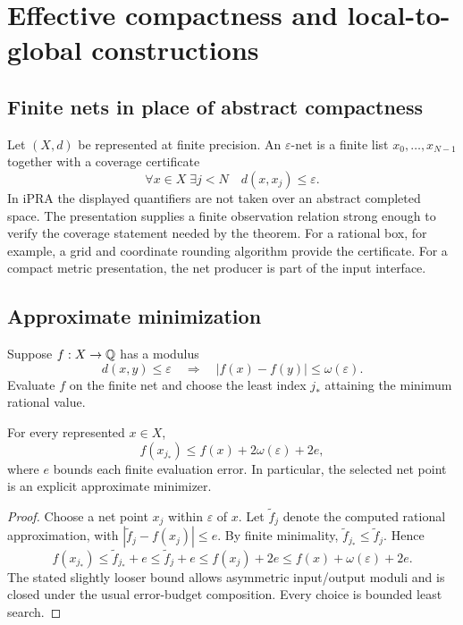 \section{Effective compactness and local-to-global constructions}
\label{sec:compact}

\subsection{Finite nets in place of abstract compactness}

Let \((X,d)\) be represented at finite precision.  An \(\varepsilon\)-net is a
finite list \(x_0,\ldots,x_{N-1}\) together with a coverage certificate
\[
       \forall x\in X\;\exists j<N\quad d(x,x_j)\le\varepsilon.
\]
In iPRA the displayed quantifiers are not taken over an abstract completed
space.  The presentation supplies a finite observation relation strong enough
to verify the coverage statement needed by the theorem.  For a rational box,
for example, a grid and coordinate rounding algorithm provide the certificate.
For a compact metric presentation, the net producer is part of the input
interface.

\subsection{Approximate minimization}

Suppose \(f:X\to\mathbb Q\) has a modulus
\[
 d(x,y)\le\varepsilon\quad\Longrightarrow\quad
 |f(x)-f(y)|\le\omega(\varepsilon).
\]
Evaluate \(f\) on the finite net and choose the least index \(j_*\) attaining
the minimum rational value.

\begin{theorem}
For every represented \(x\in X\),
\[
       f(x_{j_*})\le f(x)+2\omega(\varepsilon)+2e,
\]
where \(e\) bounds each finite evaluation error.  In particular, the selected
net point is an explicit approximate minimizer.
\end{theorem}

\begin{proof}
Choose a net point \(x_j\) within \(\varepsilon\) of \(x\).  Let
\(\widetilde f_j\) denote the computed rational approximation, with
\(|\widetilde f_j-f(x_j)|\le e\).  By finite minimality,
\(\widetilde f_{j_*}\le\widetilde f_j\).  Hence
\[
 f(x_{j_*})
 \le \widetilde f_{j_*}+e
 \le \widetilde f_j+e
 \le f(x_j)+2e
 \le f(x)+\omega(\varepsilon)+2e.
\]
The stated slightly looser bound allows asymmetric input/output moduli and is
closed under the usual error-budget composition.  Every choice is bounded
least search.
\end{proof}

